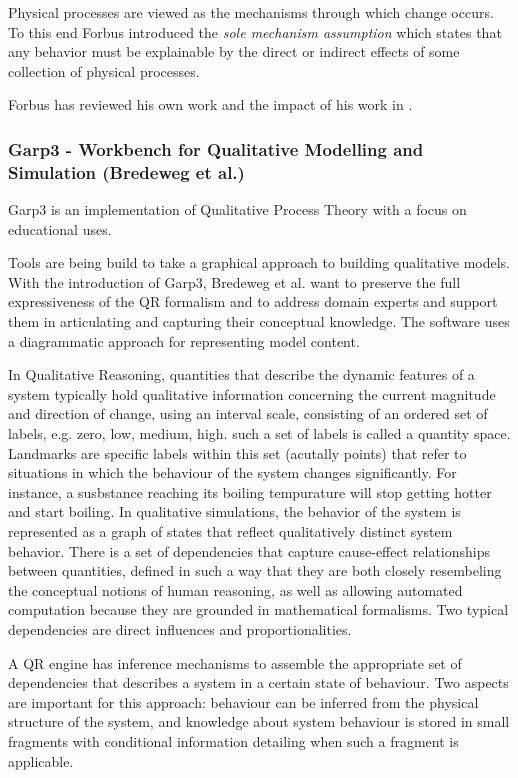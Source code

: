 \documentclass{article} %
\begin{document}
Physical processes are viewed as the mechanisms through which change occurs.
To this end Forbus introduced the \emph{sole mechanism assumption} which
states that any behavior must be explainable by the direct or indirect effects
of some collection of physical processes.

\vspace{0.8em}

Forbus has reviewed his own work and the impact of his work in
\cite{forbus12}.

\subsubsection{Garp3 - Workbench for Qualitative Modelling and Simulation
(Bredeweg et al.)}

Garp3 is an implementation of Qualitative Process Theory with a focus on
educational uses.

Tools are being build to take a graphical approach to building qualitative 
models. With the introduction of Garp3, Bredeweg et al. want to preserve the
full expressiveness of the QR formalism and to address domain experts and
support them in articulating and capturing their conceptual knowledge. The
software uses a diagrammatic approach for representing model content.

In Qualitative Reasoning, quantities that describe the dynamic features of a 
system typically hold qualitative information concerning the current magnitude 
and direction of change, using an interval scale, consisting of an ordered set 
of labels, e.g. {zero, low, medium, high}. such a set of labels
is called a quantity space. Landmarks are specific labels within this set
(acutally points) that refer to situations in which the behaviour of the system
changes significantly. For instance, a susbstance reaching its boiling
tempurature will stop getting hotter and start boiling. In qualitative
simulations, the behavior of the system is represented as a graph of states
that reflect qualitatively distinct system behavior. There is a set of
dependencies that capture cause-effect relationships between quantities,
defined in such a way that they are both closely resembeling the conceptual
notions of human reasoning, as well as allowing automated computation because
they are grounded in mathematical formalisms. Two typical dependencies are
direct influences and proportionalities.

A QR engine has inference mechanisms to assemble the appropriate set of
dependencies that describes a system in a certain state of behaviour. Two
aspects are important for this approach: behaviour can be inferred from the
physical structure of the system, and knowledge about system behaviour is
stored in small fragments with conditional information detailing when such a
fragment is applicable.
\end{document}
